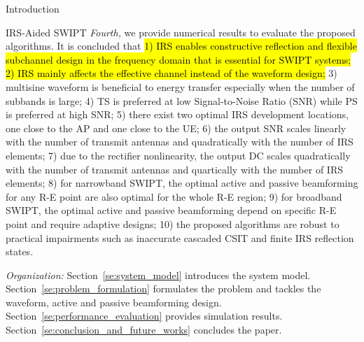 \documentclass[journal,12pt,onecolumn,draftclsnofoot]{IEEEtran}
\begin{document}
\begin{section}{Introduction}
\begin{subsection}{IRS-Aided SWIPT}
			\emph{Fourth,} we provide numerical results to evaluate the proposed algorithms. It is concluded that \hl{1) IRS enables constructive reflection and flexible subchannel design in the frequency domain that is essential for SWIPT systems; 2) IRS mainly affects the effective channel instead of the waveform design;} 3) multisine waveform is beneficial to energy transfer especially when the number of subbands is large; 4) TS is preferred at low Signal-to-Noise Ratio (SNR) while PS is preferred at high SNR; 5) there exist two optimal IRS development locations, one close to the AP and one close to the UE; 6) the output SNR scales linearly with the number of transmit antennas and quadratically with the number of IRS elements; 7) due to the rectifier nonlinearity, the output DC scales quadratically with the number of transmit antennas and quartically with the number of IRS elements; 8) for narrowband SWIPT, the optimal active and passive beamforming for any R-E point are also optimal for the whole R-E region; 9) for broadband SWIPT, the optimal active and passive beamforming depend on specific R-E point and require adaptive designs; 10) the proposed algorithms are robust to practical impairments such as inaccurate cascaded CSIT and finite IRS reflection states.

			\emph{Organization:} Section~\ref{se:system_model} introduces the system model. Section~\ref{se:problem_formulation} formulates the problem and tackles the waveform, active and passive beamforming design. Section~\ref{se:performance_evaluation} provides simulation results. Section~\ref{se:conclusion_and_future_works} concludes the paper.


\end{subsection}
\end{section}
\end{document}
